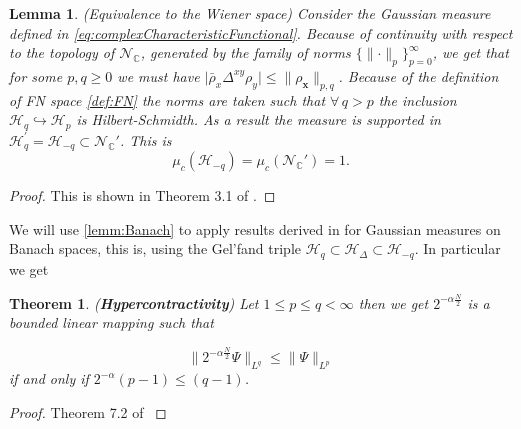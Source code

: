 \documentclass{elsarticle}%
\newtheorem{theorem}{Theorem}[section]%
\newtheorem{lemma}[lemma]{Lemma}%
\begin{document}
\begin{lemma}
\label{lemm:Banach} (Equivalence to the  Wiener space)
    Consider the Gaussian measure defined in  \eqref{eq:complexCharacteristicFunctional}. Because of continuity with respect to the topology of $\mathcal{N}_{\mathbb{C}}$, generated by the family of norms $\{ \lVert \cdot \rVert_{p}\}_{p=0}^\infty$, we get that  for some $p,q\geq 0$ we must have  $\lvert \bar\rho_{x}\Delta^{xy}\rho_y\rvert \leq \lVert \rho_{\mathbf{x}} \rVert_{p,q}$. Because of the definition of FN space \autoref{def:FN} the norms are taken such that $\forall\, q> p$ the inclusion $\mathcal{H}_q\hookrightarrow \mathcal{H}_p$ is Hilbert-Schmidth. As a result the measure is supported in ${\mathcal{H}}_q^\prime=\mathcal{H}_{-q}\subset \mathcal{N}_{\mathbb{C}}'$. This is 
    \begin{equation*}
        \mu_c(\mathcal{H}_{-q})= \mu_c(\mathcal{N}_{\mathbb{C}}')= 1.
    \end{equation*}
\end{lemma}


\begin{proof}
   This is shown in Theorem 3.1 of \cite{hidaBrownianMotion1980} . 
\end{proof}

We will use \autoref{lemm:Banach} to apply results derived in \cite{huAnalysisGaussian2016} for Gaussian measures on Banach spaces, this is, using the Gel'fand triple $\mathcal{H}_{q}\subset\mathcal{H}_{\Delta}\subset \mathcal{H}_{-q}$. In particular we get 

\begin{theorem}{(\textbf{Hypercontractivity})} Let $1 \leq p \leq q < \infty$ then we get $2^{-\alpha\frac{{N}}{2}}$ is a bounded linear mapping such that 

\begin{equation}
   \lVert  2^{-\alpha\frac{{N}}{2}} \Psi \rVert_{L^q} \leq \lVert \Psi \rVert_{L^p}
\end{equation}
if and only if $2^{-\alpha} (p-1)\leq (q-1)$.    
\end{theorem}
\begin{proof}
    Theorem 7.2 of \cite{huAnalysisGaussian2016}
\end{proof}
\end{document}
